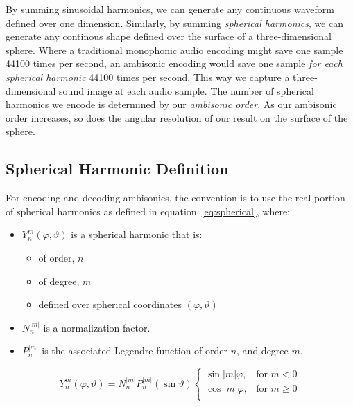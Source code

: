 By summing sinusoidal harmonics, we can generate any continuous
waveform defined over one dimension. Similarly, by summing
\emph{spherical harmonics}, we can generate any continous shape
defined over the surface of a three-dimensional sphere. Where a
traditional monophonic audio encoding might save one sample 44100
times per second, an ambisonic encoding would save one sample
\emph{for each spherical harmonic} 44100 times per second. This way we
capture a three-dimensional sound image at each audio sample.  The
number of spherical harmonics we encode is determined by our
\textit{ambisonic order}. As our ambisonic order increases, so does
the angular resolution of our result on the surface of the sphere.

\subsection{Spherical Harmonic Definition}
For encoding and decoding ambisonics, the convention is to use the
real portion of spherical harmonics as defined in
equation~\ref{eq:spherical}, where:
\begin{itemize}
\item $Y_{n}^{m}(\varphi,\vartheta)$ is a spherical harmonic that
is:
\begin{itemize}
\item of order, $n$
\item of degree, $m$
\item defined over spherical coordinates $(\varphi, \vartheta)$
\end{itemize}
\item $N_n^{|m|}$ is a normalization factor.\cite{Nachbar2011}
\item $P_n^{|m|}$ is the associated Legendre function of order $n$,
  and degree $m$.
\end{itemize}
\begin{equation}
Y_{n}^{m}(\varphi,\vartheta)=N_n^{|m|}P_n^{|m|}(\sin{\vartheta})
\begin{cases}\label{eq:spherical}
\sin{|m|\varphi},&  \text{for $m<0$}\\  
\cos{|m|\varphi},& \text{for $m\geq 0$}\\
\end{cases}
\end{equation}
